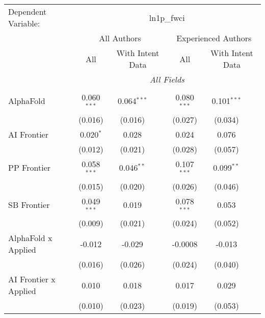 \begingroup
\centering
\begin{tabular}{lcccccc}
   \tabularnewline \midrule \midrule
   Dependent Variable: & \multicolumn{6}{c}{ln1p\_fwci}\\
 & \multicolumn{3}{c}{All Authors} & \multicolumn{3}{c}{Experienced Authors} \\
\cmidrule(lr){2-4} \cmidrule(lr){5-7}
 & \multicolumn{1}{c}{All} & \multicolumn{2}{c}{With Intent Data} & \multicolumn{1}{c}{All} & \multicolumn{2}{c}{With Intent Data} \\
\cmidrule(lr){2-2} \cmidrule(lr){3-4} \cmidrule(lr){5-5} \cmidrule(lr){6-7}
 & \multicolumn{6}{c}{\textit{All Fields}} \\ \\
   AlphaFold                      & 0.060$^{***}$ & 0.064$^{***}$ &               & 0.080$^{***}$ & 0.101$^{***}$ &   \\   
                                  & (0.016)       & (0.016)       &               & (0.027)       & (0.034)       &   \\   
   AI Frontier                    & 0.020$^{*}$   & 0.028         &               & 0.024         & 0.076         &   \\   
                                  & (0.012)       & (0.021)       &               & (0.028)       & (0.057)       &   \\   
   PP Frontier                    & 0.058$^{***}$ & 0.046$^{**}$  &               & 0.107$^{***}$ & 0.099$^{**}$  &   \\   
                                  & (0.015)       & (0.020)       &               & (0.026)       & (0.046)       &   \\   
   SB Frontier                    & 0.049$^{***}$ & 0.019         &               & 0.078$^{***}$ & 0.053         &   \\   
                                  & (0.009)       & (0.021)       &               & (0.024)       & (0.052)       &   \\   
   AlphaFold x Applied            & -0.012        & -0.029        &               & -0.0008       & -0.013        &   \\   
                                  & (0.016)       & (0.026)       &               & (0.024)       & (0.040)       &   \\   
   AI Frontier x Applied          & 0.010         & 0.018         &               & 0.017         & 0.029         &   \\   
                                  & (0.010)       & (0.023)       &               & (0.019)       & (0.053)       &   \\   

\end{tabular}
